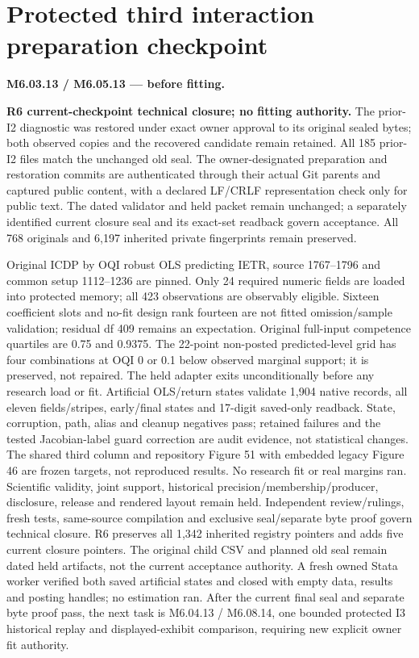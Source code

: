 \documentclass[11pt,a4paper]{article}
\begin{document}
\section*{Protected third interaction preparation checkpoint}
\noindent\textbf{M6.03.13 / M6.05.13 --- before fitting.}
\par\noindent\textbf{R6 current-checkpoint technical closure; no fitting authority.}
The prior-I2 diagnostic was restored under exact owner approval to its
original sealed bytes; both observed copies and the recovered candidate
remain retained. All 185 prior-I2 files match the unchanged old seal.
The owner-designated preparation and restoration commits are authenticated
through their actual Git parents and captured public content, with a
declared LF/CRLF representation check only for public text. The dated
validator and held packet remain unchanged; a separately identified
current closure seal and its exact-set readback govern acceptance.
All 768 originals and 6,197 inherited private fingerprints remain preserved.
\par\noindent
Original ICDP by OQI robust OLS predicting IETR, source 1767--1796 and
common setup 1112--1236 are pinned. Only 24 required numeric fields are
loaded into protected memory; all 423 observations are observably eligible.
Sixteen coefficient slots and no-fit design rank fourteen are not fitted
omission/sample validation; residual df 409 remains an expectation.
Original full-input competence quartiles are 0.75 and 0.9375. The
22-point non-posted predicted-level grid has four combinations at OQI 0
or 0.1 below observed marginal support; it is preserved, not repaired.
The held adapter exits unconditionally before any research load or fit.
Artificial OLS/return states validate 1,904 native records, all eleven
fields/stripes, early/final states and 17-digit saved-only readback.
State, corruption, path, alias and cleanup negatives pass; retained
failures and the tested Jacobian-label guard correction are audit evidence,
not statistical changes. The shared third column and repository Figure 51
with embedded legacy Figure 46 are frozen targets, not reproduced results.
No research fit or real margins ran. Scientific validity, joint support,
historical precision/membership/producer, disclosure, release and rendered
layout remain held. Independent review/rulings, fresh tests, same-source
compilation and exclusive seal/separate byte proof govern technical closure.
R6 preserves all 1,342 inherited registry pointers and adds five current
closure pointers. The original child CSV and planned old seal remain dated
held artifacts, not the current acceptance authority. A fresh owned Stata
worker verified both saved artificial states and closed with empty data,
results and posting handles; no estimation ran. After the current final
seal and separate byte proof pass, the next task is
M6.04.13 / M6.08.14, one bounded protected I3 historical replay and
displayed-exhibit comparison, requiring new explicit owner fit authority.
\end{document}

